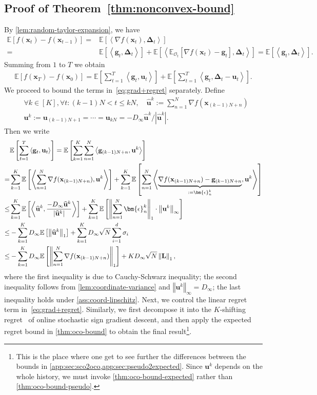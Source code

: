 \documentclass{article}
\def \E {\mathbb{E}}
\def \x {\mathbf{x}}
\def \g {\mathbf{g}}
\def \O {\mathcal{O}}
\def \u {\mathbf{u}}
\def \uh {\widehat{\u}}
\def \Lb {\mathbf{L}}
\newcommand{\inner}[2]{\left\langle #1, #2 \right\rangle}
\newcommand{\norm}[1]{\left\Vert#1\right\Vert}
\newcommand{\abs}[1]{\left|#1\right|}
\def \eps {\bm{\epsilon}}
\def \bDelta {\bm{\Delta}}
\newcommand{\sqbrac}[1]{\left[#1\right]}
\begin{document}
\subsection{Proof of Theorem~\ref{thm:nonconvex-bound}\label{app:sec:exponential}}

By \cref{lem:random-taylor-expansion}, we have
\begin{align*}
    \E\sqbrac{f(\x_t)-f(\x_{t-1})}=&\E\sqbrac{\inner{\nabla f(\x_t)}{\bDelta_t}}\\=&\E\sqbrac{\inner{\g_t}{\bDelta_t}}+\E\sqbrac{\inner{\E_{\O_t}\sqbrac{\nabla f(\x_t)-\g_t}}{\bDelta_t}}=\E\sqbrac{\inner{\g_t}{\bDelta_t}}.
\end{align*}
Summing from $1$ to $T$ we obtain
\begin{align}\label{eq:grad+regret}
    \E\sqbrac{f(\x_T)-f(\x_0)}=\E\sqbrac{\sum_{t=1}^T\inner{\g_t}{\u_t}}+\E\sqbrac{\sum_{t=1}^T\inner{\g_t}{\bDelta_t-\u_t}}.
\end{align}
We proceed to bound the terms in~\eqref{eq:grad+regret} separately. Define
\begin{equation}
\begin{aligned}\label{eq:def-uk}
    &\forall k\in[K],\forall t:(k-1)N<t\le kN,\quad\uh^k:=\sum_{n=1}^N\nabla f(\x_{(k-1)N+n})\\&\u^k:=\u_{(k-1)N+1}=\cdots=\u_{kN}=-D_\infty\uh^k/\abs{\uh^k}.
\end{aligned}
\end{equation}
Then we write
\begin{align}
    &\E\sqbrac{\sum_{t=1}^T\inner{\g_t}{\u_t}}=\E\sqbrac{\sum_{k=1}^K\sum_{n=1}^N\inner{\g_{(k-1)N+n}}{\u^k}}\notag\\=&\sum_{k=1}^K\E\sqbrac{\inner{\sum_{n=1}^N\nabla f(\x_{(k-1)N+n})}{\u^k}}+\sum_{k=1}^K\E\sqbrac{\sum_{n=1}^N\inner{\underbrace{\nabla f(\x_{(k-1)N+n})-\g_{(k-1)N+n}}_{:=\eps_n^k}}{\u^k}}\notag\\\le&\sum_{k=1}^K\E\sqbrac{\inner{\uh^k}{\frac{-D_\infty\uh^k}{\abs{\uh^k}}}}+\sum_{k=1}^K\E\sqbrac{\norm{\sum_{n=1}^N\eps_n^k}_1\cdot\norm{\u^k}_\infty}\label{eq:bound-grad-inner-prod}\\\le&-\sum_{k=1}^KD_\infty\E\sqbrac{\norm{\uh^k}_1}+\sum_{k=1}^KD_\infty\sqrt{N}\sum_{i=1}^d\sigma_i\notag\\\le&-\sum_{k=1}^KD_\infty\E\sqbrac{\norm{\sum_{n=1}^N\nabla f(\x_{(k-1)N+n})}_1}+KD_\infty\sqrt{N}\norm{\Lb}_1\notag,
\end{align}
where the first inequality is due to Cauchy-Schwarz inequality; the second inequality follows from \cref{lem:coordinate-variance} and $\norm{\u^k}_\infty=D_\infty$; the last inequality holds under \cref{ass:coord-lipschitz}. Next, we control the linear regret term in~\eqref{eq:grad+regret}. Similarly, we first decompose it into the $K$-shifting regret~\citep{cutkosky2023optimal} of online stochastic sign gradient descent, and then apply the expected regret bound in \cref{thm:oco-bound} to obtain the final result\footnote{This is the place where one get to see further the differences between the bounds in \cref{app:sec:sco2oco,app:sec:pseudo2expected}. Since $\u^k$ depends on the whole history, we must invoke \cref{thm:oco-bound-expected} rather than \cref{thm:oco-bound-pseudo}.}.
\end{document}
